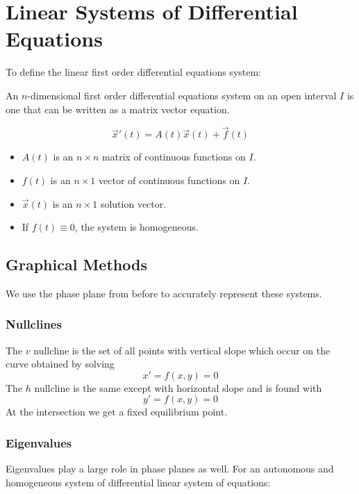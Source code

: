\section{Linear Systems of Differential Equations}
To define the linear first order differential equations system:

An $n$-dimensional first order differential equations system on an open interval $I$ is one that can be written as a matrix vector equation.

    \begin{equation}\label{eq:desystem_vector_form}
        \vec{x} \prime (t) = A(t) \vec{x}(t) + \vec{f}(t)
    \end{equation}

    \begin{itemize}
        \item $A(t)$ is an $n \times n$ matrix of continuous functions on $I$.
        \item $f(t)$ is an $n \times 1$ vector of continuous functions on $I$.
        \item $\vec{x}(t)$ is an $n \times 1$ solution vector.
        \item If $f(t) \equiv 0$, the system is homogeneous.
    \end{itemize}

    \subsection{Graphical Methods}
    We use the phase plane from before to accurately represent these systems.

        \subsubsection{Nullclines}
        The $v$ nullcline is the set of all points with vertical slope which occur on the curve obtained by solving
            \[
                x\prime = f(x, y) = 0
            \]
        The $h$ nullcline is the same except with horizontal slope and is found with
            \[
                y\prime = f(x, y) = 0
            \]
        At the intersection we get a fixed equilibrium point.

        \subsubsection{Eigenvalues}
        Eigenvalues play a large role in phase planes as well. For an autonomous and homogeneous system of differential linear system of equations:

